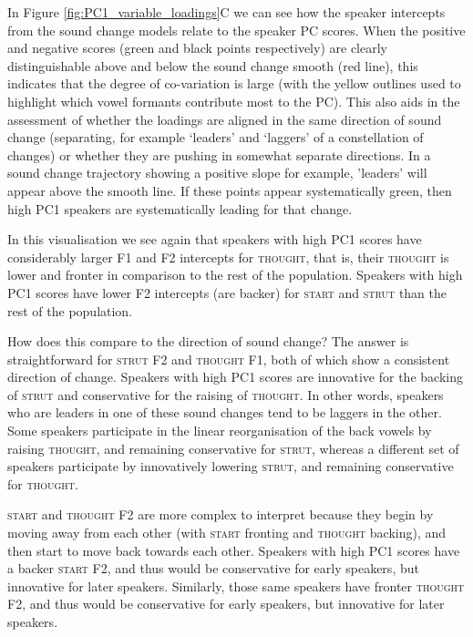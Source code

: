 \documentclass[review]{elsarticle} %
\begin{document}
In Figure \ref{fig:PC1_variable_loadings}C we can see how the speaker intercepts from the sound change models relate to the speaker PC scores. When the positive and negative scores (green and black points respectively) are clearly distinguishable above and below the sound change smooth (red line), this indicates that the degree of co-variation is large (with the yellow outlines used to highlight which vowel formants contribute most to the PC). This also aids in the assessment of whether the loadings are aligned in the same direction of sound change (separating, for example `leaders' and `laggers' of a constellation of changes) or whether they are pushing in somewhat separate directions.  In a sound change trajectory showing a positive slope for example, 'leaders' will appear above the smooth line.  If these points appear systematically green, then high PC1 speakers are systematically leading for that change.

In this visualisation we see again that speakers with high PC1 scores have considerably larger F1 and F2 intercepts for \textsc{thought}, that is, their \textsc{thought} is lower and fronter in comparison to the rest of the population.
Speakers with high PC1 scores have lower F2 intercepts (are backer) for \textsc{start} and \textsc{strut} than the rest of the population.

How does this compare to the direction of sound change?  The answer is straightforward for \textsc{strut} F2 and \textsc{thought} F1, both of which show a consistent direction of change.  Speakers with high PC1 scores are innovative for the backing of \textsc{strut} and conservative for the raising of \textsc{thought}.  In other words, speakers who are leaders in one of these sound changes tend to be laggers in the other. Some speakers participate in the linear reorganisation of the back vowels by raising \textsc{thought}, and remaining conservative for \textsc{strut}, whereas a different set of speakers participate by innovatively lowering \textsc{strut}, and remaining conservative for \textsc{thought}.

\textsc{start} and \textsc{thought} F2 are more complex to interpret because they begin by moving away from each other (with \textsc{start} fronting and \textsc{thought} backing), and then start to move back towards each other. Speakers with high PC1 scores have a backer \textsc{start} F2, and thus would be conservative for early speakers, but innovative for later speakers.  Similarly, those same speakers have fronter \textsc{thought} F2, and thus would be conservative for early speakers, but innovative for later speakers.
\end{document}
